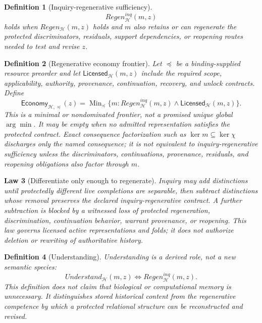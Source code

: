 \documentclass[11pt,oneside]{article}
\newtheorem{definition}{Definition}[section]
\newtheorem{law}[definition]{Law}
\begin{document}
\begin{definition}[Inquiry-regenerative sufficiency]
\[
\boxed{
Regen^{inq}_{\mathcal H}(m,z)
}
\]
holds when \(Regen_{\mathcal H}(m,z)\) holds and \(m\) also retains or can regenerate the protected discriminators, residuals, support dependencies, or reopening routes needed to test and revise \(z\).
\end{definition}

\begin{definition}[Regenerative economy frontier]\label{def:regenerative-economy}
Let \(\preceq\) be a binding-supplied resource preorder and let
\(\mathsf{Licensed}_{\mathcal H}(m,z)\) include the required scope, applicability,
authority, provenance, continuation, recovery, and unlock contracts.  Define
\[
\boxed{
\mathsf{Economy}_{\mathcal H,\preceq}(z)
=
\operatorname{Min}_{\preceq}
\{
m:
Regen^{inq}_{\mathcal H}(m,z)
\land
\mathsf{Licensed}_{\mathcal H}(m,z)
\}.
}
\]
This is a minimal or nondominated frontier, not a promised unique global
\(\arg\min\).  It may be empty when no admitted representation satisfies the protected
contract.  Exact consequence factorization such as
\(\ker m\subseteq\ker\chi\) discharges only the named consequence; it is not equivalent
to inquiry-regenerative sufficiency unless the discriminators, continuations,
provenance, residuals, and reopening obligations also factor through \(m\).
\end{definition}

\begin{law}[Differentiate only enough to regenerate]\label{law:regenerative-economy}
Inquiry may add distinctions until protectedly different live completions are
separable, then subtract distinctions whose removal preserves the declared
inquiry-regenerative contract.  A further subtraction is blocked by a witnessed loss
of protected regeneration, discrimination, continuation behavior, warrant provenance,
or reopening.  This law governs licensed active representations and folds; it does not
authorize deletion or rewriting of authoritative history.
\end{law}

\begin{definition}[Understanding]
Understanding is a derived role, not a new semantic species:
\[
\boxed{
Understand_{\mathcal H}(m,z)
\iff
Regen^{inq}_{\mathcal H}(m,z).
}
\]
This definition does not claim that biological or computational memory is unnecessary.  It distinguishes stored historical content from the regenerative competence by which a protected relational structure can be reconstructed and revised.
\end{definition}
\end{document}
